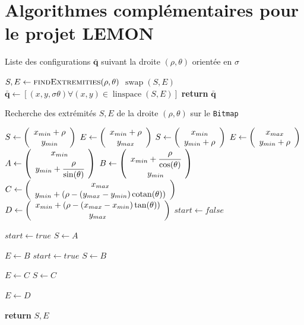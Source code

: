 \documentclass[french,A4paper,]{book}
\begin{document}
\chapter{Algorithmes complémentaires pour le projet
LEMON}\label{sec:annlemon}

\begin{algorithm}
\caption{Liste des configurations $\bm\bar q$ suivant la droite $(\rho, \theta)$ orientée en $\sigma$}
\label{alg:line}
\begin{algorithmic}[1]

\State $S, E \gets \Call{findExtremities}{\rho, \theta}$
\State $\operatorname{swap}(S, E)$
\EndIf
\State $\bm{\bar q} \gets [(x, y, \sigma\theta) \forall (x, y) \in \operatorname{linspace}(S, E)]$
\State \textbf{return} $\bm{\bar q}$
\EndProcedure
\end{algorithmic}
\end{algorithm}

\begin{algorithm}
\caption{Recherche des extrémités $S, E$ de la droite $(\rho, \theta)$ sur le \texttt{Bitmap}}
\label{alg:extremites}
\begin{algorithmic}[1]

    \State $S \gets \left(\begin{array}{c}{x_{min} + \rho} \\ {y_{min}}\end{array}\right)$
    \State $E \gets \left(\begin{array}{c}{x_{min} + \rho} \\ {y_{max}}\end{array}\right)$
    \State $S \gets \left(\begin{array}{c}{x_{min}} \\ {y_{min} + \rho}\end{array}\right)$
    \State $E \gets \left(\begin{array}{c}{x_{max}} \\ {y_{min} + \rho}\end{array}\right)$
\Else
    \State $A \gets \left(\begin{array}{c}{x_{min}} \\ { y_{min} + \cfrac{\rho }{ \sin(\theta)}}\end{array}\right)$
    \State $B \gets \left(\begin{array}{c}{x_{min} + \cfrac{\rho }{ \cos(\theta)}} \\ { y_{min}}\end{array}\right)$
    \State $C \gets \left(\begin{array}{c}{x_{max}} \\ { y_{min} + (\rho - (y_{max} - y_{min}) \operatorname{cotan}(\theta))}\end{array}\right)$
    \State $D \gets \left(\begin{array}{c}{ x_{min} + \left(\rho - (x_{max} - x_{min}) \tan(\theta)\right)} \\ { y_{max}}\end{array}\right)$
    \State $start \gets false$

        \State $start \gets true$
        \State $S \gets A$
    \EndIf

            \State $E \gets B$
        \Else
            \State $start \gets true$
            \State $S \gets B$
        \EndIf
    \EndIf

            \State $E \gets C$
        \Else
            \State $S \gets C$
        \EndIf
    \EndIf

        \State $E \gets D$
    \EndIf

\EndIf

\State \textbf{return} $S, E$
\EndProcedure
\end{algorithmic}
\end{algorithm}
\end{document}
